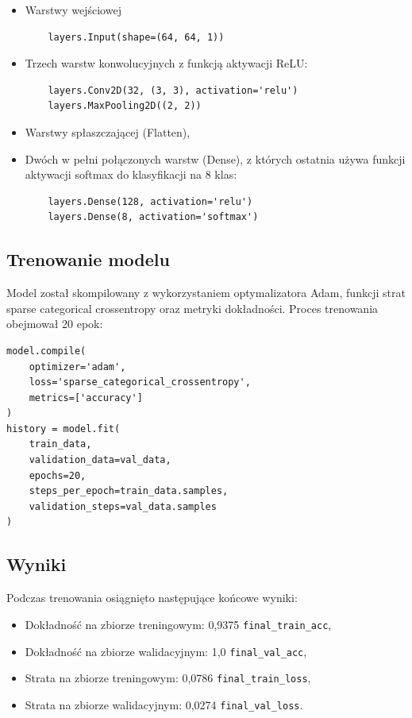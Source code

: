 \begin{itemize}
    \item Warstwy wejściowej
    \begin {verbatim}
    layers.Input(shape=(64, 64, 1))
    \end {verbatim}
    \item Trzech warstw konwolucyjnych z funkcją aktywacji ReLU:
    \begin{verbatim}
    layers.Conv2D(32, (3, 3), activation='relu')
    layers.MaxPooling2D((2, 2))
    \end{verbatim}
    \item Warstwy spłaszczającej (Flatten),
    \item Dwóch w pełni połączonych warstw (Dense), z których ostatnia używa funkcji aktywacji softmax do klasyfikacji na 8 klas:
    \begin{verbatim}
    layers.Dense(128, activation='relu')
    layers.Dense(8, activation='softmax')
    \end{verbatim}
\end{itemize}

\subsection{Trenowanie modelu}\label{subsec:trenowanie-modelu}

Model został skompilowany z wykorzystaniem optymalizatora Adam, funkcji strat sparse categorical crossentropy oraz metryki dokładności.
Proces trenowania obejmował 20 epok:

\begin{verbatim}
model.compile(
    optimizer='adam',
    loss='sparse_categorical_crossentropy',
    metrics=['accuracy']
)
history = model.fit(
    train_data,
    validation_data=val_data,
    epochs=20,
    steps_per_epoch=train_data.samples,
    validation_steps=val_data.samples
)
\end{verbatim}

\subsection{Wyniki}\label{subsec:wyniki}

Podczas trenowania osiągnięto następujące końcowe wyniki:

\begin{itemize}
    \item Dokładność na zbiorze treningowym: 0,9375 \texttt{final\_train\_acc},
    \item Dokładność na zbiorze walidacyjnym: 1,0  \texttt{final\_val\_acc},
    \item Strata na zbiorze treningowym: 0,0786  \texttt{final\_train\_loss},
    \item Strata na zbiorze walidacyjnym: 0,0274  \texttt{final\_val\_loss}.
\end{itemize}

